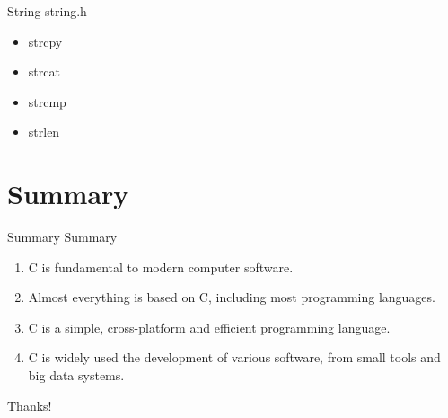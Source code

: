 \documentclass[UTF8]{beamer}
\begin{document}
\begin{frame}[t]{String}
    string.h
    \begin{itemize}
        \item strcpy
        \item strcat
        \item strcmp
        \item strlen
    \end{itemize}
\end{frame}

\section*{Summary}
\begin{frame}[t]{Summary}
    Summary
\begin{enumerate}
    \item C is fundamental to modern computer software.
    \item Almost everything is based on C, including most programming languages.
    \item C is a simple, cross-platform and efficient programming language.
    \item C is widely used the development of various software, from small tools and big data systems.
\end{enumerate}
\end{frame}
\begin{frame}
  \centerline{\Huge{Thanks!}}
\end{frame}
\end{document}
